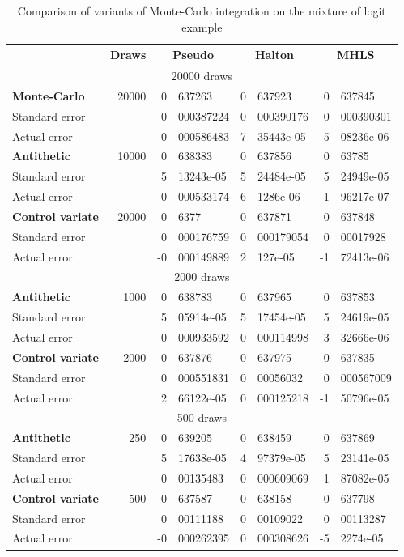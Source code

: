 \documentclass[12pt,a4paper]{article}
\begin{document}
\begin{table}[htb]
\begin{center}
\begin{tabular}{lr|r@{.}lr@{.}lr@{.}l}
    & Draws   & \multicolumn{2}{c}{Pseudo} &  \multicolumn{2}{c}{Halton} &
  \multicolumn{2}{c}{MHLS} \\
\hline 
\multicolumn{8}{c}{20000 draws} \\
\hline
\textbf{Monte-Carlo}  & 20000   & 0&637263 & 0&637923 & 0&637845 \\
Standard error & & 0&000387224 & 0&000390176 & 0&000390301 \\
Actual error   & & -0&000586483 & 7&35443e-05 & -5&08236e-06 \\
\hline
\textbf{Antithetic} & 10000  & 0&638383 & 0&637856 & 0&63785 \\
Standard error & & 5&13243e-05 & 5&24484e-05 & 5&24949e-05 \\
Actual error & & 0&000533174 & 6&1286e-06 & 1&96217e-07 \\
\hline
\textbf{Control variate} & 20000 & 0&6377 & 0&637871 & 0&637848 \\
Standard error & & 0&000176759 & 0&000179054 & 0&00017928 \\
Actual error & & -0&000149889 & 	2&127e-05 & -1&72413e-06 \\
\hline
\multicolumn{8}{c}{2000 draws} \\
\hline
\textbf{Antithetic} & 1000  & 0&638783 & 0&637965  & 0&637853 \\
Standard error & & 5&05914e-05 & 5&17454e-05 & 5&24619e-05 \\
Actual error & & 0&000933592 & 0&000114998 & 3&32666e-06 \\
\hline
\textbf{Control variate} & 2000 & 0&637876 & 0&637975 & 0&637835 \\
Standard error & & 0&000551831  &0&00056032 & 0&000567009 \\
Actual error & &  2&66122e-05  &0&000125218 & -1&50796e-05 \\
\hline
\multicolumn{8}{c}{500 draws} \\
\hline
\textbf{Antithetic} & 250  & 0&639205 & 0&638459 &0&637869 \\
Standard error & & 5&17638e-05 & 4&97379e-05 & 5&23141e-05 \\
Actual error & & 0&00135483 & 0&000609069 & 1&87082e-05 \\
\hline
\textbf{Control variate} & 500 & 0&637587 & 0&638158 &0&637798 \\
Standard error & & 0&00111188 &	0&00109022 & 0&00113287 \\
Actual error & &  -0&000262395 & 0&000308626 & -5&2274e-05 \\
\hline
\end{tabular}
\caption{\label{tab:resultsML}Comparison of variants of
  Monte-Carlo integration on the mixture of logit example}
\end{center}
\end{table}
\end{document}
